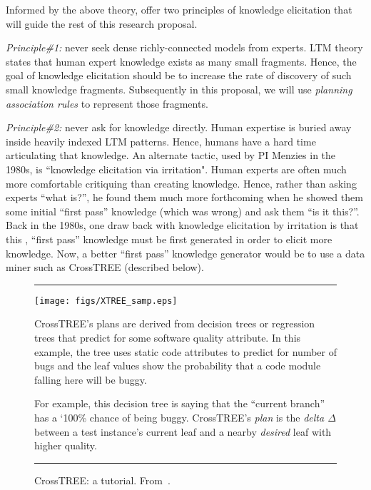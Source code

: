 Informed by the above theory, offer two principles of knowledge elicitation that will guide the rest of this research proposal.
\bi
\item {\em Principle\#1:}
never seek   dense richly-connected models from experts.  LTM theory states that human expert knowledge exists as many small fragments.
Hence,  the goal of knowledge elicitation should be to  increase
the rate of discovery  of such  small knowledge fragments. Subsequently  in this proposal, we will use {\em planning
association rules} to represent those fragments.
\item
{\em Principle\#2:} never ask for knowledge directly. Human expertise is buried away inside heavily indexed LTM patterns. Hence, humans have a hard time articulating
that knowledge. An alternate tactic, used by PI Menzies in the 1980s, is ``knowledge elicitation via irritation".   Human experts  are often much more comfortable critiquing than creating knowledge. Hence, rather than asking experts ``what is?'', he found them much more forthcoming when he showed them some initial ``first pass'' knowledge (which was wrong) and ask them  ``is it this?''.  
Back in the 1980s, one draw back with knowledge elicitation by irritation is that 
this ,  ``first pass''  knowledge must be first generated in order to elicit more knowledge. Now, a better ``first pass'' knowledge generator would be  to use a data miner such as CrossTREE   (described below).
\ei
 


 \begin{figure}[!b]
 \hrule
 
 \begin{minipage}{.59\linewidth}
 \vspace{1mm}
\texttt{[image: figs/XTREE\_samp.eps]}
\end{minipage}
\begin{minipage}{.40\linewidth}
\small
CrossTREE's plans 
are derived from decision trees or regression trees that predict for some software quality
attribute. 
In this example, the tree uses static code attributes to predict for number of bugs
and the leaf values show the probability
that a code module falling here will be buggy. 

For example,  this decision tree is saying that
the ``current branch'' has a `100\% chance of being buggy.
CrossTREE's  {\em plan} is the {\em delta $\Delta$} between
a test instance's current leaf and a nearby {\em desired} leaf with higher quality.
\end{minipage}

\hrule

\caption{CrossTREE: a tutorial. From~\cite{Kr16}.}\label{fig:tutorial}
\end{figure}

